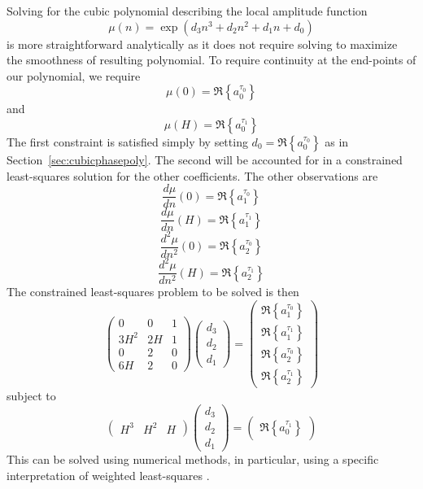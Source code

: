 \documentclass[letterpaper,12pt]{report}
\begin{document}
Solving for the cubic polynomial describing the local amplitude function
\begin{equation}
    \mu(n) = \exp \left(d_3 n^{3} + d_2 n^{2} + d_1 n + d_0 \right)
\end{equation}
is more straightforward analytically as it does not require solving to maximize
the smoothness of resulting polynomial. To require continuity at the end-points
of our polynomial, we require
\[
    \mu(0) = \Re \left\{ a^{\tau_0}_0 \right\}
\]
and
\[
    \mu(H) = \Re \left\{ a^{\tau_1}_0 \right\}
\]
The first constraint is satisfied simply by setting $d_0 = \Re \left\{
a^{\tau_0}_0 \right\}$ as in Section~\ref{sec:cubicphasepoly}. The second will be
accounted for in a constrained least-squares solution for the other
coefficients. The other observations are
\[
    \frac{d \mu}{dn} (0) = \Re \left\{ a^{\tau_0}_1 \right\}
\]
\[
    \frac{d \mu}{dn} (H) = \Re \left\{ a^{\tau_1}_1 \right\}
\]
\[
    \frac{d^2 \mu}{dn^2} (0) = \Re \left\{ a^{\tau_0}_2 \right\}
\]
\[
    \frac{d^2 \mu}{dn^2} (H) = \Re \left\{ a^{\tau_1}_2 \right\}
\]
The constrained least-squares problem to be solved is then
\begin{equation}
    \begin{pmatrix}
        0 & 0 & 1 \\
        3 H^2 & 2 H & 1 \\
        0 & 2 & 0 \\
        6 H & 2 & 0
    \end{pmatrix}
    \begin{pmatrix}
        d_3 \\
        d_2 \\
        d_1
    \end{pmatrix}
    =
    \begin{pmatrix}
        \Re \left\{ a^{\tau_0}_1 \right\} \\
        \Re \left\{ a^{\tau_1}_1 \right\} \\
        \Re \left\{ a^{\tau_0}_2 \right\} \\
        \Re \left\{ a^{\tau_1}_2 \right\}
    \end{pmatrix}
\end{equation}
subject to
\[
    \begin{pmatrix}
        H^3 & H^2 & H
    \end{pmatrix}
    \begin{pmatrix}
        d_3 \\
        d_2 \\
        d_1
    \end{pmatrix}
    =
    \begin{pmatrix}
        \Re \left\{ a^{\tau_1}_0 \right\}
    \end{pmatrix}
\]
This can be solved using numerical methods, in particular, using a specific
interpretation of weighted least-squares \cite[p.~266]{golub1996matrix}.
\end{document}
